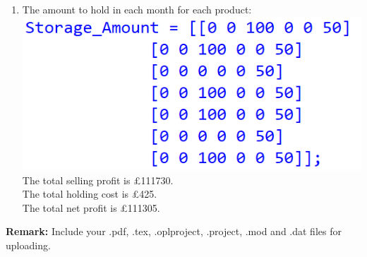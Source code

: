 \documentclass[12pt,a4paper]{article}
\makeatletter
\newtheorem*{solution}{Solution}
\theoremstyle{definition}
\renewenvironment{solution}[1][Solution] {\par\pushQED{\qed}\normalfont\topsep6\p@\@plus6\p@\relax\trivlist\item[\hskip\labelsep\bfseries#1\@addpunct{.}]\ignorespaces}{\popQED\endtrivlist\@endpefalse} \makeatother
\makeatother
\begin{document}
\begin{enumerate}
\begin{solution}
		The amount to hold in each month for each product: \\
		\includegraphics[scale=0.9]{storage.png} \\
		The total selling profit is \pounds 111730. \\
		The total holding cost is \pounds 425. \\
		The total net profit is \pounds 111305. 
	\end{solution}
\end{enumerate}



\textbf{Remark:} Include your .pdf, .tex, .oplproject, .project, .mod and .dat files for uploading.


\end{document}
